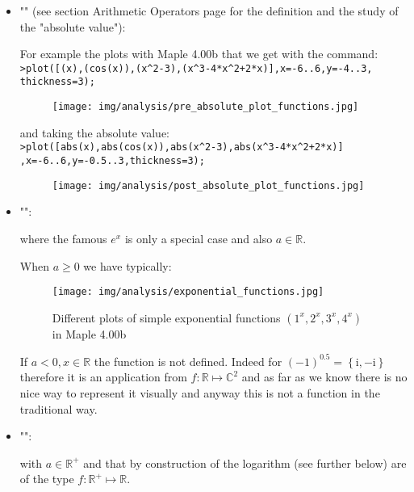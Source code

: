\begin{enumerate}
\begin{itemize}
			\item "\label{absolute value plot}" (see section Arithmetic Operators page \pageref{absolute value} for the definition and the study of the "absolute value"):
			
			For example the plots with Maple 4.00b that we get with the command:\\
			
			\texttt{>plot([(x),(cos(x)),(x\string^2-3),(x\string^3-4*x\string^2+2*x)],x=-6..6,y=-4..3,\\
			thickness=3);}	
			
			\begin{figure}[H]
				\centering
				\texttt{[image: img/analysis/pre\_absolute\_plot\_functions.jpg]}
			\end{figure}
			
			and taking the absolute value:\\
			
			\texttt{>plot([abs(x),abs(cos(x)),abs(x\string^2-3),abs(x\string^3-4*x\string^2+2*x)]\\
			,x=-6..6,y=-0.5..3,thickness=3);}
			\begin{figure}[H]
				\centering
				\texttt{[image: img/analysis/post\_absolute\_plot\_functions.jpg]}
			\end{figure}
		
		\item "":
			
			where the famous $e^x$ is only a special case and also $a\in\mathbb{R}$.
			
			When $a\geq 0$ we have typically:
			\begin{figure}[H]
				\centering
				\texttt{[image: img/analysis/exponential\_functions.jpg]}
				\caption{Different plots of simple exponential functions $(1^x,2^x,3^x,4^x)$ in Maple 4.00b}
			\end{figure}			
			If $a<0,x\in\mathbb{R}$ the function is not defined. Indeed for $(-1)^{0.5}=\left\lbrace \mathrm{i},	-\mathrm{i}	\right\rbrace$ therefore it is an application from $f:\mathbb{R}\mapsto\mathbb{C}^2$ and as far as we know there is no nice way to represent it visually and anyway this is not a function in the traditional way.
			
			\item "":
				
			with $a\in\mathbb{R}^{+}$ and that by construction of the logarithm (see further below) are of the type $f:\mathbb{R}^{+}\mapsto \mathbb{R}$.
			

\end{itemize}
\end{enumerate}
